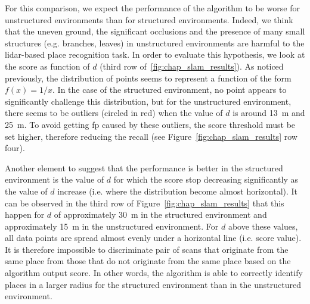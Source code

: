 For this comparison, we expect the performance of the algorithm to be worse for unstructured environments than for structured environments. Indeed, we think that the uneven ground, the significant occlusions and the presence of many small structures (e.g. branches, leaves) in unstructured environments are harmful to the \gls*{lidar}-based place recognition task. In order to evaluate this hypothesis, we look at the score as function of $d$ (third row of~\ref{fig:chap_slam_results}). As noticed previously, the distribution of points seems to represent a function of the form $f(x) = 1 / x$. In the case of the structured environment, no point appears to significantly challenge this distribution, but for the unstructured environment, there seems to be outliers (circled in red) when the value of $d$ is around \SI{13}{\meter} and \SI{25}{\meter}. To avoid getting \gls*{fp} caused by these outliers, the score threshold must be set higher, therefore reducing the recall (see Figure~\ref{fig:chap_slam_results} row four).

Another element to suggest that the performance is better in the structured environment is the value of $d$ for which the score stop decreasing significantly as the value of $d$ increase (i.e. where the distribution become almost horizontal). It can be observed in the third row of Figure~\ref{fig:chap_slam_results} that this happen for $d$ of approximately \SI{30}{\meter} in the structured environment and approximately \SI{15}{\meter} in the unstructured environment. For $d$ above these values, all data points are spread almost evenly under a horizontal line (i.e. score value). It is therefore impossible to discriminate pair of scans that originate from the same place from those that do not originate from the same place based on the algorithm output score. In other words, the algorithm is able to correctly identify places in a larger radius for the structured environment than in the unstructured environment.



